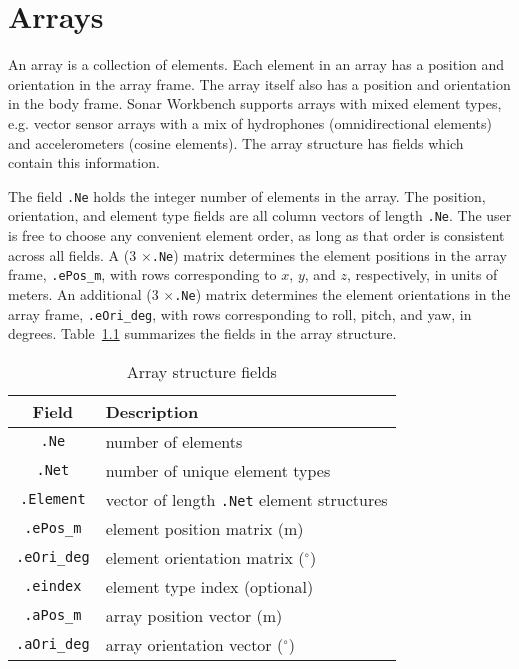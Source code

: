 \chapter{Arrays}\label{ch:array}

An array is a collection of elements. Each element in an array has a position and orientation in the array frame. The array itself also has a position and orientation in the body frame. Sonar Workbench supports arrays with mixed element types, e.g. vector sensor arrays with a mix of hydrophones (omnidirectional elements) and accelerometers (cosine elements). The array structure has fields which contain this information.

The field \texttt{.Ne} holds the integer number of elements in the array. The position, orientation, and element type fields are all column vectors of length \texttt{.Ne}. The user is free to choose any convenient element order, as long as that order is consistent across all fields. A (3 $\times$\texttt{.Ne}) matrix determines the element positions in the array frame, \texttt{.ePos\_m}, with rows corresponding to $x$, $y$, and $z$, respectively, in units of meters. An additional (3 $\times$\texttt{.Ne}) matrix determines the element orientations in the array frame, \texttt{.eOri\_deg}, with rows corresponding to roll, pitch, and yaw, in degrees. Table~\ref{tab:ArrayFields} summarizes the fields in the array structure. 

\begin{table}[!ht]
	\begin{center}
		\caption{Array structure fields}
		\label{tab:ArrayFields}
		\begin{tabular}{c|l} 
			\textbf{Field} & \textbf{Description} \\
			\hline
			\texttt{.Ne} & number of elements \\
			\texttt{.Net} & number of unique element types \\
			\texttt{.Element} & vector of length \texttt{.Net} element structures \\
			\texttt{.ePos\_m} & element position matrix (m) \\
			\texttt{.eOri\_deg} & element orientation matrix ($^\circ$) \\
			\texttt{.eindex} & element type index (optional) \\
			\texttt{.aPos\_m} & array position vector (m) \\
			\texttt{.aOri\_deg} & array orientation vector ($^\circ$) \\
		\end{tabular}
	\end{center}
\end{table}

